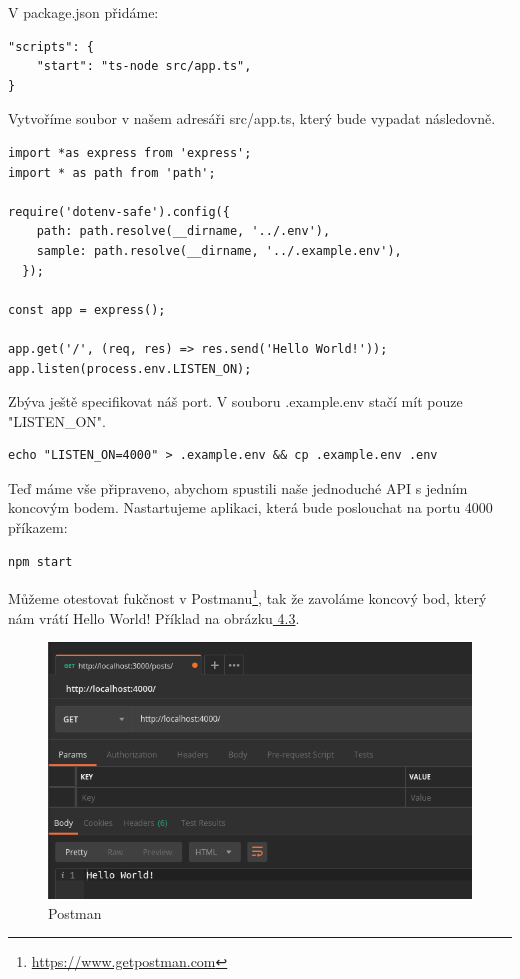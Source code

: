 \documentclass[thesis=B,czech]{FITthesis}[2012/06/26]
\begin{document}
        V package.json přidáme:
        \begin{verbatim}
"scripts": {
    "start": "ts-node src/app.ts",
}
        \end{verbatim}
        Vytvoříme soubor v našem adresáři src/app.ts, který bude vypadat následovně.
        \begin{verbatim}
import *as express from 'express';
import * as path from 'path';

require('dotenv-safe').config({
    path: path.resolve(__dirname, '../.env'),
    sample: path.resolve(__dirname, '../.example.env'),
  });

const app = express();

app.get('/', (req, res) => res.send('Hello World!'));
app.listen(process.env.LISTEN_ON);
        \end{verbatim}
        Zbýva ještě specifikovat náš port. V souboru .example.env stačí mít pouze "LISTEN\_ON".
        \begin{verbatim}
echo "LISTEN_ON=4000" > .example.env && cp .example.env .env
        \end{verbatim}
        Teď máme vše připraveno, abychom spustili naše jednoduché API s jedním koncovým bodem. Nastartujeme aplikaci, která bude poslouchat na portu 4000 příkazem:  
        \begin{verbatim}
npm start
        \end{verbatim}
        Můžeme otestovat fukčnost v Postmanu\footnote{\url{https://www.getpostman.com}}, tak že zavoláme koncový bod, který nám vrátí Hello World! Příklad na obrázku\hyperref[fig:Postman]{ 4.3}.
        \begin{figure}[h!]
            \includegraphics[width=\linewidth]{PostmanHelloWorld}
            \caption{Postman}
        \end{figure}
\end{document}
